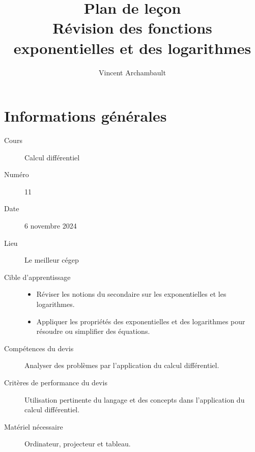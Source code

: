 \documentclass[12pt]{article}
\title{\sffamily Plan de leçon\\ Révision des fonctions exponentielles et des logarithmes}
\author{\sffamily Vincent Archambault}
\date{}
\begin{document}
\maketitle

\section*{Informations générales}
\begin{description}
\item[\faBook{} Cours] Calcul différentiel
\item[{\faHashtag} Numéro] 11
\item[{\faCalendar*[regular]} Date] 6 novembre 2024
\item[\faLandmark{} Lieu] Le meilleur cégep
\item[\faBullseye{} Cible d'apprentissage]
\mbox{}\newline\leavevmode\vspace{-3ex}\begin{itemize}
    \item Réviser les notions du secondaire sur les exponentielles et les logarithmes.
    \item Appliquer les propriétés des exponentielles et des logarithmes pour résoudre ou simplifier des équations.
\end{itemize}
\item[\faToolbox{} Compétences du devis] Analyser des problèmes par l’application du calcul différentiel.
\item[\faUserCheck{} Critères de performance du devis] Utilisation pertinente du langage et des concepts dans l’application du calcul différentiel.
\item[\faTv{} Matériel nécessaire] Ordinateur, projecteur et tableau.
\end{description}

\clearpage
\end{document}
